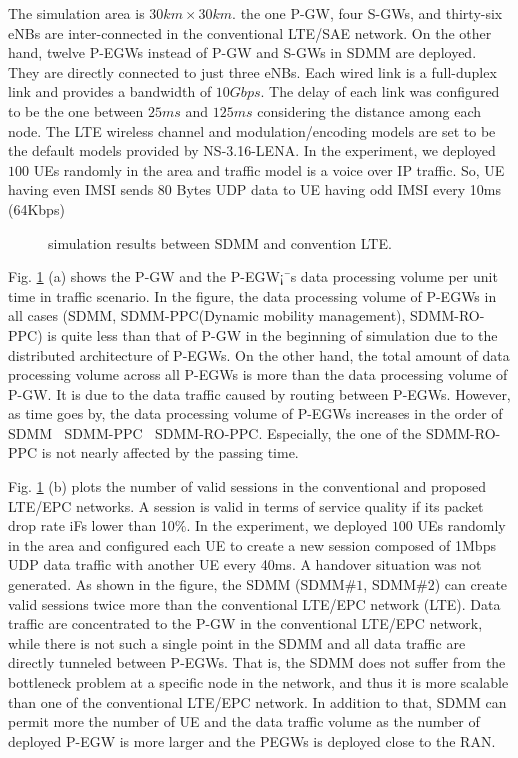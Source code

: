 \documentclass[runningheads,a4paper]{llncs}
\begin{document}
The simulation area is $30 km \times 30 km$. the one P-GW, four S-GWs, and thirty-six eNBs are inter-connected in the conventional LTE/SAE network. On the other hand, twelve P-EGWs instead of P-GW and S-GWs in SDMM are deployed. They are directly connected to just three eNBs. Each wired link is a full-duplex link and provides a bandwidth of $10 Gbps$. The delay of each link was configured to be the one between $25 ms$ and $125 ms$ considering the distance among each node. The LTE wireless channel and modulation/encoding models are set to be the default models provided by NS-3.16-LENA. In the experiment, we deployed $100$ UEs randomly in the area and traffic model is a voice over IP traffic. So, UE having even IMSI sends 80 Bytes UDP data to UE having odd IMSI every 10ms (64Kbps)

\begin{figure}[t]
    \centering
    \caption{simulation results between SDMM and convention LTE.}
    \label{fig:3}
\end{figure}

Fig. \ref{fig:3} (a) shows the P-GW and the P-EGW¡¯s data processing volume per unit time in traffic scenario. In the figure, the data processing volume of P-EGWs in all cases (SDMM, SDMM-PPC(Dynamic mobility management), SDMM-RO-PPC) is quite less than that of P-GW in the beginning of simulation due to the distributed architecture of P-EGWs. On the other hand, the total amount of data processing volume across all P-EGWs is more than the data processing volume of P-GW. It is due to the data traffic caused by routing between P-EGWs. However, as time goes by, the data processing volume of P-EGWs increases in the order of SDMM $\>$ SDMM-PPC $\>$ SDMM-RO-PPC. Especially, the one of the SDMM-RO-PPC is not nearly affected by the passing time.

Fig. \ref{fig:3} (b) plots the number of valid sessions in the conventional and proposed LTE/EPC networks. A session is valid in terms of service quality if its packet drop rate iFs lower than 10$\%$. In the experiment, we deployed $100$ UEs randomly in the area and configured each UE to create a new session composed of 1Mbps UDP data traffic with another UE every 40ms. A handover situation was not generated. As shown in the figure, the SDMM (SDMM$\#1$, SDMM$\#2$) can create valid sessions twice more than the conventional LTE/EPC network (LTE). Data traffic are concentrated to the P-GW in the conventional LTE/EPC network, while there is not such a single point in the SDMM and all data traffic are directly tunneled between P-EGWs. That is, the SDMM does not suffer from the bottleneck problem at a specific node in the network, and thus it is more scalable than one of the conventional LTE/EPC network. In addition to that, SDMM can permit more the number of UE and the data traffic volume as the number of deployed P-EGW is more larger and the PEGWs is deployed close to the RAN.
\end{document}
